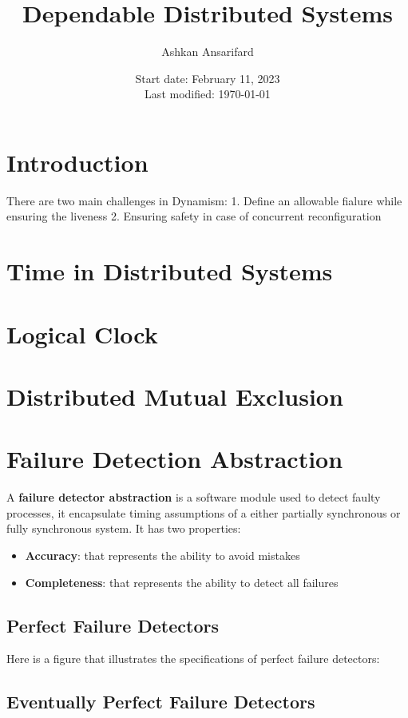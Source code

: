\documentclass{article}
\title{Dependable Distributed Systems}
\author{Ashkan Ansarifard}
\date{Start date: February 11, 2023 \\ Last modified: \today}
\begin{document}
	
	\maketitle
	\newpage
	\tableofcontents
	
	\newpage
	\newpage
	\section{Introduction}
	There are two main challenges in Dynamism:
	1. Define an allowable fialure while ensuring the liveness
	2. Ensuring safety in case of concurrent reconfiguration
	
	\newpage
	\section{Time in Distributed Systems}
	
	\newpage
	\section{Logical Clock}
	
	\newpage
	\section{Distributed Mutual Exclusion}
	
	\newpage
	\section{Failure Detection Abstraction}
	A \textbf{failure detector abstraction} is a software module used to detect faulty processes, it encapsulate timing assumptions of a either partially synchronous or fully synchronous system. It has two properties:
	\begin{itemize}
		\item \textbf{Accuracy}: that represents the ability to avoid mistakes
		\item \textbf{Completeness}: that represents the ability to detect all failures
	\end{itemize}
	
	\subsection{Perfect Failure Detectors}
	\label{sec:perfect-failure-detectors}
	Here is a figure that illustrates the specifications of perfect failure detectors:

	
	\subsection{Eventually Perfect Failure Detectors}
	
\end{document}
